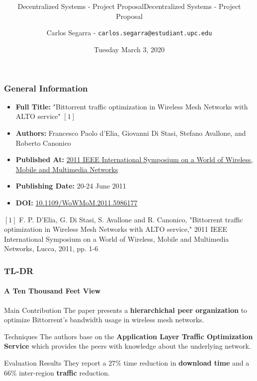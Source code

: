 \documentclass[10pt,    %
    english,            %
    xcolor=table,       %
    envcountsect,        %
    aspectratio=169     %
]{beamer}
\subtitle{Decentralized Systems - Project Proposal} %
\title[\mainTitle] %
    {\Large \mainTitle \\ \normalsize \secondTitle}
\subtitle{Decentralized Systems - Project Proposal} %
\date[March 3, 2020] %
    {Tuesday March 3, 2020}
\author[] %
{Carlos Segarra - \texttt{carlos.segarra@estudiant.upc.edu}}
\begin{document}
\begin{frame}
  \titlepage
\end{frame}

\begin{frame}
    \frametitle{General Information}

    \begin{itemize}
        \item \textbf{Full Title:} "Bittorrent traffic optimization in Wireless Mesh Networks with ALTO service" $[1]$
        \item \textbf{Authors:} Francesco Paolo d'Elia, Giovanni Di Stasi, Stefano Avallone, and Roberto Canonico
        \item \textbf{Published At:} \href{https://ieeexplore.ieee.org/xpl/conhome/5976314/proceeding}{2011 IEEE International Symposium on a World of Wireless, Mobile and Multimedia Networks}
        \item \textbf{Publishing Date:} 20-24 June 2011
        \item \textbf{DOI:} \href{https://doi.org/10.1109/WoWMoM.2011.5986177}{10.1109/WoWMoM.2011.5986177}
    \end{itemize}


    \small
    \begin{description}
        \item $[1]$ F. P. D'Elia, G. Di Stasi, S. Avallone and R. Canonico, "Bittorrent traffic optimization in Wireless Mesh Networks with ALTO service," 2011 IEEE International Symposium on a World of Wireless, Mobile and Multimedia Networks, Lucca, 2011, pp. 1-6
    \end{description}
 

\end{frame}

\begin{frame}
    \frametitle{TL-DR}
    \framesubtitle{A Ten Thousand Feet View}

    \vspace{-25pt}

    \begin{alertblock}{Main Contribution}
        The paper presents a \textbf{hierarchichal peer organization} to optimize Bittorrent's bandwidth usage in wireless mesh networks.
    \end{alertblock}

    \begin{block}{Techniques}
        The authors base on the \textbf{Application Layer Traffic Optimization Service} which provides the peers with knowledge about the underlying network.
    \end{block}

    \begin{alertblock}{Evaluation Results}
        They report a $27\%$ time reduction in \textbf{download time} and a $66\%$ inter-region \textbf{traffic} reduction.
    \end{alertblock}

\end{frame}
\end{document}
